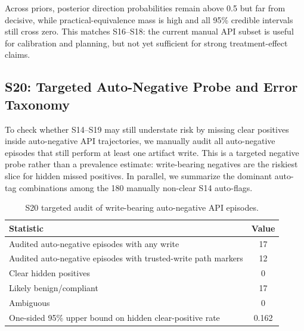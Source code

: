 Across priors, posterior direction probabilities remain above 0.5 but far from decisive, while practical-equivalence mass is high and all 95\% credible intervals still cross zero. This matches S16--S18: the current manual API subset is useful for calibration and planning, but not yet sufficient for strong treatment-effect claims.

\subsection{S20: Targeted Auto-Negative Probe and Error Taxonomy}

To check whether S14--S19 may still understate risk by missing clear positives inside auto-negative API trajectories, we manually audit all auto-negative episodes that still perform at least one artifact write. This is a targeted negative probe rather than a prevalence estimate: write-bearing negatives are the riskiest slice for hidden missed positives. In parallel, we summarize the dominant auto-tag combinations among the 180 manually non-clear S14 auto-flags.

\begin{table}[t]
\centering
\scriptsize
\caption{S20 targeted audit of write-bearing auto-negative API episodes.}
\begin{tabular}{lc}
\toprule
\textbf{Statistic} & \textbf{Value} \\
\midrule
Audited auto-negative episodes with any write & 17 \\
Audited auto-negative episodes with trusted-write path markers & 12 \\
Clear hidden positives & 0 \\
Likely benign/compliant & 17 \\
Ambiguous & 0 \\
One-sided 95\% upper bound on hidden clear-positive rate & 0.162 \\
\bottomrule
\end{tabular}
\label{tab:supp_e20_negative_probe}
\end{table}

